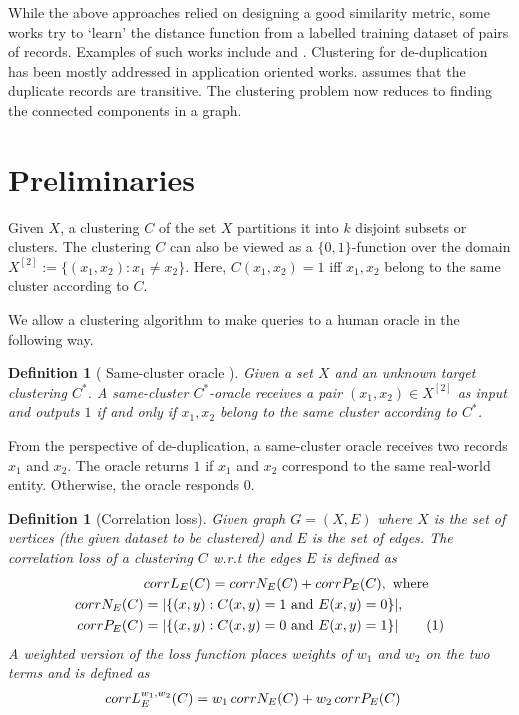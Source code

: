 \documentclass[12pt]{article}
\newtheorem{definition}[theorem]{Definition}
\newcommand\numberthis{\addtocounter{equation}{1}\tag{\theequation}}
\begin{document}
While the above approaches relied on designing a good similarity metric, some works try to `learn' the distance function from a labelled training dataset of pairs of records. Examples of such works include \cite{cochinwala2001efficient} and \cite{bilenko2003adaptive}. Clustering for de-duplication has been mostly addressed in application oriented works. \cite{hernandez1995merge} assumes that the duplicate records are transitive. The clustering problem now reduces to finding the connected components in a graph. 

\section{Preliminaries}
\label{section:problemFormulation}
Given $X$, a clustering $C$ of the set $X$ partitions it into $k$ disjoint subsets or clusters. The clustering $C$ can also be viewed as a $\{0, 1\}$-function over the domain $X^{[2]} := \{(x_1, x_2) : x_1 \neq x_2\}$. Here, $C(x_1, x_2) = 1$ iff $x_1, x_2$ belong to the same cluster according to $C$.

We allow a clustering algorithm to make queries to a human oracle in the following way. 
\begin{definition}[ Same-cluster oracle \cite{ashtiani2016clustering}]
Given a set $X$ and an unknown target clustering $C^*$. A same-cluster $C^*$-oracle receives a pair $(x_1, x_2) \in X^{[2]}$ as input and outputs $1$ if and only if $x_1, x_2$ belong to the same cluster according to $C^*$. 
\end{definition}
From the perspective of de-duplication, a same-cluster oracle receives two records $x_1$ and $x_2$. The oracle returns $1$ if $x_1$ and $x_2$ correspond to the same real-world entity. Otherwise, the oracle responds $0$.

\begin{definition}[Correlation loss\cite{bansal2004correlation}]
\label{defn:correlationLoss}
Given graph $G = (X, E)$ where $X$ is the set of vertices (the given dataset to be clustered) and $E$ is the set of edges. The correlation loss of a clustering $C$ w.r.t the edges $E$ is defined as \begin{align*}
  &corrL_{E}(C) = corrN_{E}(C) + corrP_{E}(C), \text{ where}\\
  corrN_{E}(C) &= |\{(x, y): C(x, y) = 1 \text{ and } E(x, y) = 0\}|,\\ 
  corrP_{E}(C) &= |\{(x, y): C(x, y) = 0 \text{ and } E(x, y) = 1\}| \numberthis\label{eqn:correlationLoss}
\end{align*}
A weighted version of the loss function places weights of $w_1$ and $w_2$ on the two terms and is defined as 
\begin{align}
  &corrL_{E}^{w_1, w_2}(C) = w_1 \thinspace corrN_{E}(C) + w_2 \thinspace corrP_{E}(C)\label{eqn:weightedCorrelationLoss}
\end{align}
\end{definition}
\end{document}
